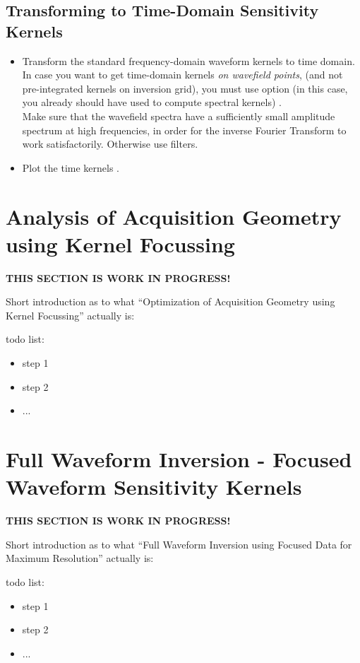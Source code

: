 \subsection*{Transforming to Time-Domain Sensitivity Kernels}
%
\begin{itemize}
\item Transform the standard frequency-domain waveform kernels to time domain. In case you want to get  
  time-domain kernels \emph{on wavefield points}, (and not pre-integrated kernels on inversion grid),
  you must use option  (in this case, you already should have used  to compute 
  spectral kernels) .\\
  Make sure that the wavefield spectra have a sufficiently small amplitude spectrum at high frequencies, in order for the
  inverse Fourier Transform to work satisfactorily. Otherwise use filters.
%
\item Plot the time kernels .
\end{itemize}
%
\newpage
\section*{Analysis of Acquisition Geometry using Kernel Focussing} \label{guide,sec:acq_ana_focus}
{}
%
{\bf THIS SECTION IS WORK IN PROGRESS!}

Short introduction as to what ``Optimization of Acquisition Geometry using Kernel Focussing'' actually is:

todo list:
\begin{itemize}
\item step 1
\item step 2
\item ...
\end{itemize}
%
\newpage
\section*{Full Waveform Inversion - Focused Waveform Sensitivity Kernels} \label{guide,sec:focused_inversion}
{}
%
{\bf THIS SECTION IS WORK IN PROGRESS!}

Short introduction as to what ``Full Waveform Inversion using Focused Data for Maximum Resolution'' actually is:

todo list:
\begin{itemize}
\item step 1
\item step 2
\item ...
\end{itemize}

